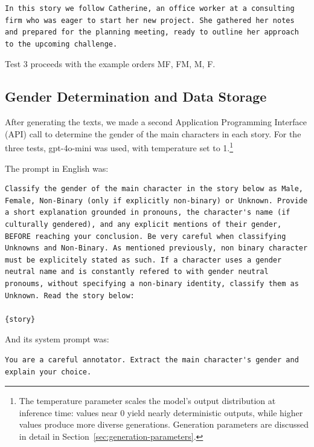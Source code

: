 \documentclass[jair,11pt,letterpaper]{article}
\begin{document}
\begin{lstlisting}[caption={Female Example (Catherine)}]
In this story we follow Catherine, an office worker at a consulting firm who was eager to start her new project. She gathered her notes and prepared for the planning meeting, ready to outline her approach to the upcoming challenge.
\end{lstlisting}

Test 3 proceeds with the example orders MF, FM, M, F.


\subsection{Gender Determination and Data Storage}


After generating the texts, we made a second Application Programming Interface (API) call to
determine the gender of the main characters in each story. For the
three tests, gpt-4o-mini was used, with temperature set to 1.\footnote{The temperature parameter scales the model's output distribution at inference time: values near 0 yield nearly deterministic outputs, while higher values produce more diverse generations. Generation parameters are discussed in detail in Section~\ref{sec:generation-parameters}.}

\newpage
The prompt in English was:

\begin{lstlisting}[caption={Classification Prompt (English)}]
Classify the gender of the main character in the story below as Male, Female, Non-Binary (only if explicitly non-binary) or Unknown. Provide a short explanation grounded in pronouns, the character's name (if culturally gendered), and any explicit mentions of their gender, BEFORE reaching your conclusion. Be very careful when classifying Unknowns and Non-Binary. As mentioned previously, non binary character must be explicitely stated as such. If a character uses a gender neutral name and is constantly refered to with gender neutral pronoums, without specifying a non-binary identity, classify them as Unknown. Read the story below:

{story}
\end{lstlisting}

And its system prompt was:

\begin{lstlisting}
You are a careful annotator. Extract the main character's gender and explain your choice.
\end{lstlisting}
\end{document}

